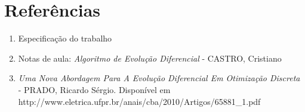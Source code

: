 \documentclass[12pt]{elsarticle}
\begin{document}
	\section{Referências}
	\begin{enumerate}
		\item Especificação do trabalho
		\item Notas de aula: \textit{Algoritmo de Evolução Diferencial} - CASTRO, Cristiano
		\item \textit{Uma Nova Abordagem Para A Evolução Diferencial Em Otimização Discreta} - PRADO, Ricardo Sérgio. Disponível em http://www.eletrica.ufpr.br/anais/cba/2010/Artigos/65881\_1.pdf
	\end{enumerate}
	
\end{document}
